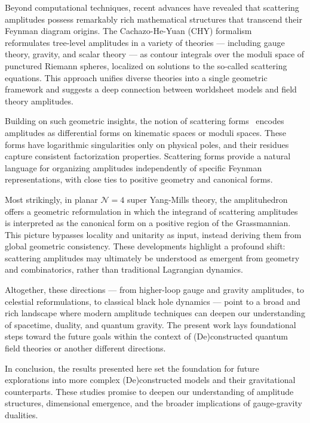 \documentclass[12pt]{article}
\numberwithin{equation}{section}
\begin{document}
Beyond computational techniques, recent advances have revealed that scattering amplitudes possess remarkably rich mathematical structures that transcend their Feynman diagram origins. The Cachazo-He-Yuan (CHY) formalism~\cite{Cachazo:2013gna}~\cite{Cachazo:2013hca}~\cite{Cachazo:2013iea} reformulates tree-level amplitudes in a variety of theories — including gauge theory, gravity, and scalar theory — as contour integrals over the moduli space of punctured Riemann spheres, localized on solutions to the so-called scattering equations. This approach unifies diverse theories into a single geometric framework and suggests a deep connection between worldsheet models and field theory amplitudes.

Building on such geometric insights, the notion of scattering forms~\cite{Arkani-Hamed:2017mur} encodes amplitudes as differential forms on kinematic spaces or moduli spaces. These forms have logarithmic singularities only on physical poles, and their residues capture consistent factorization properties. Scattering forms provide a natural language for organizing amplitudes independently of specific Feynman representations, with close ties to positive geometry and canonical forms.

Most strikingly, in planar \( \mathcal{N}=4 \) super Yang-Mills theory, the amplituhedron offers a geometric reformulation in which the integrand of scattering amplitudes is interpreted as the canonical form on a positive region of the Grassmannian. This picture bypasses locality and unitarity as input, instead deriving them from global geometric consistency. These developments highlight a profound shift: scattering amplitudes may ultimately be understood as emergent from geometry and combinatorics, rather than traditional Lagrangian dynamics.

Altogether, these directions — from higher-loop gauge and gravity amplitudes, to celestial reformulations, to classical black hole dynamics — point to a broad and rich landscape where modern amplitude techniques can deepen our understanding of spacetime, duality, and quantum gravity. The present work lays foundational steps toward the future goals within the context of (De)constructed quantum field theories or another different directions. 

In conclusion, the results presented here set the foundation for future explorations into more complex (De)constructed models and their gravitational counterparts. These studies promise to deepen our understanding of amplitude structures, dimensional emergence, and the broader implications of gauge-gravity dualities.
\newpage
\appendix
\end{document}
